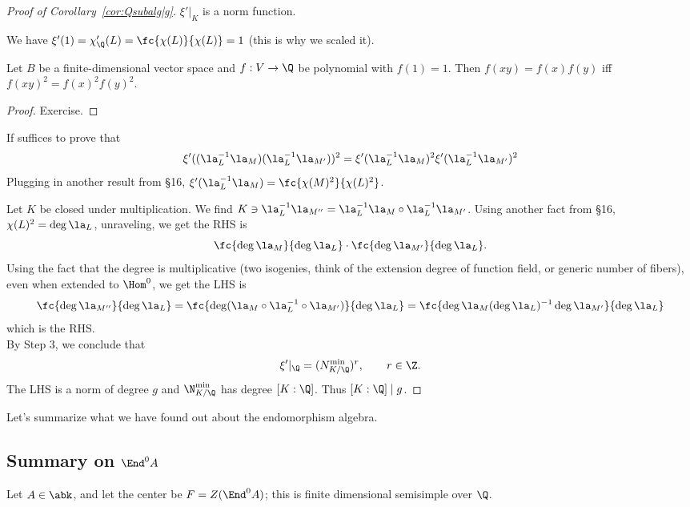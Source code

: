 \begin{proof}[Proof of Corollary~\ref{cor:Qsubalg|g}]
 $\xi'|_K$ is a norm function.

We have $\xi'(1)=\chi_{\Q}'(L)=\fc{\chi(L)}{\chi(L)}=1$ (this is why we scaled it). 

\begin{lem}
Let $B$ be a finite-dimensional vector space and $f:V\to \Q$ be polynomial with $f(1)=1$. Then $f(xy)=f(x)f(y)$ iff $f(xy)^2=f(x)^2f(y)^2$.
\end{lem}
\begin{proof}
Exercise.
\end{proof}
If suffices to prove that 
\[
\xi'((\la_L^{-1}\la_M)(\la_L^{-1} \la_{M'}))^2=\xi'(\la_L^{-1}\la_M)^2\xi'(\la_L^{-1}\la_{M'})^2
\]
Plugging in another result from \S16, $\xi'(\la_L^{-1}\la_M)=\fc{\chi(M)^2}{\chi(L)^2}$. 

Let $K$ be closed under multiplication.  We find $K\ni \la_L^{-1}\la_{M''}=\la_L^{-1}\la_M \circ \la_L^{-1}\la_{M'}$. Using another fact from \S16, $\chi(L)^2=\deg \la_L$, unraveling, we get the RHS is 
\[
\fc{\deg \la_M}{\deg \la_L}\cdot \fc{\deg \la_{M'}}{\deg \la_L}.
\] 
Using the fact that the degree is multiplicative (two isogenies, think of the extension degree of function field, or generic number of fibers), even when extended to $\Hom^0$, we get the LHS is
\[
\fc{\deg\la_{M''}}{\deg\la_L}=\fc{\deg (\la_M\circ \la_L^{-1}\circ \la_{M'})}{\deg\la_L}=\fc{\deg \la_M(\deg \la_L)^{-1} \deg\la_{M'}}{\deg \la_L}
\]
which is the RHS. \\

 By Step 3, we conclude that 
\[
\xi'|_{\Q}=(N_{K/\Q}^{\min})^r,\qquad r\in \Z.
\]
The LHS is a norm of degree $g$ and $\N_{K/\Q}^{\min}$ has degree $[K:\Q]$. Thus $[K:\Q]\mid g$.
\end{proof}
Let's summarize what we have found out about the endomorphism algebra. 
\subsection{Summary on $\End^0A$}
Let $A\in \abk$, and let the center be $F=Z(\End^0A)$; this is
finite dimensional semisimple over $\Q$.

